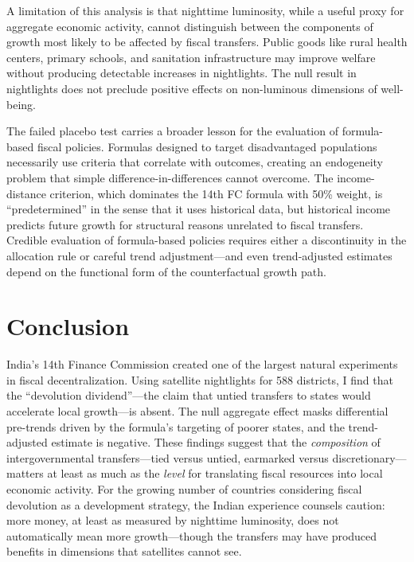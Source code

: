 \documentclass[12pt]{article}
\begin{document}
A limitation of this analysis is that nighttime luminosity, while a useful proxy for aggregate economic activity, cannot distinguish between the components of growth most likely to be affected by fiscal transfers. Public goods like rural health centers, primary schools, and sanitation infrastructure may improve welfare without producing detectable increases in nightlights. The null result in nightlights does not preclude positive effects on non-luminous dimensions of well-being.

The failed placebo test carries a broader lesson for the evaluation of formula-based fiscal policies. Formulas designed to target disadvantaged populations necessarily use criteria that correlate with outcomes, creating an endogeneity problem that simple difference-in-differences cannot overcome. The income-distance criterion, which dominates the 14th FC formula with 50\% weight, is ``predetermined'' in the sense that it uses historical data, but historical income predicts future growth for structural reasons unrelated to fiscal transfers. Credible evaluation of formula-based policies requires either a discontinuity in the allocation rule \citep{litschig2012intergovernmental, dahlberg2008using} or careful trend adjustment---and even trend-adjusted estimates depend on the functional form of the counterfactual growth path.


\section{Conclusion}

India's 14th Finance Commission created one of the largest natural experiments in fiscal decentralization. Using satellite nightlights for 588 districts, I find that the ``devolution dividend''---the claim that untied transfers to states would accelerate local growth---is absent. The null aggregate effect masks differential pre-trends driven by the formula's targeting of poorer states, and the trend-adjusted estimate is negative. These findings suggest that the \emph{composition} of intergovernmental transfers---tied versus untied, earmarked versus discretionary---matters at least as much as the \emph{level} for translating fiscal resources into local economic activity. For the growing number of countries considering fiscal devolution as a development strategy, the Indian experience counsels caution: more money, at least as measured by nighttime luminosity, does not automatically mean more growth---though the transfers may have produced benefits in dimensions that satellites cannot see.
\end{document}
